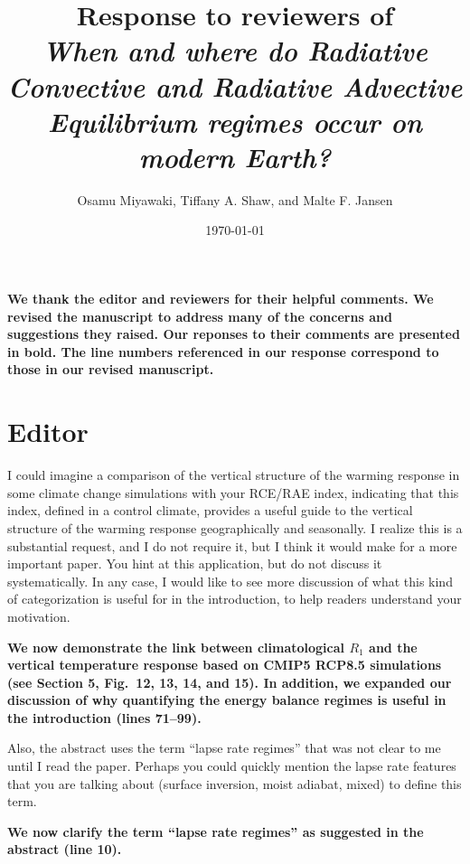 \documentclass{article}
\title{Response to reviewers of \\ \textit{When and where do Radiative Convective and Radiative Advective Equilibrium regimes occur on modern Earth?}}
\date{\today}
\author{Osamu Miyawaki, Tiffany A. Shaw, and Malte F. Jansen}
\begin{document}
\maketitle

\textbf{We thank the editor and reviewers for their helpful comments. We revised the manuscript to address many of the concerns and suggestions they raised. Our reponses to their comments are presented in bold. The line numbers referenced in our response correspond to those in our revised manuscript.}

\section*{Editor}
I could imagine a comparison of the vertical structure of the warming response in some climate change simulations with your RCE/RAE index, indicating that this index, defined in a control climate, provides a useful guide to the vertical structure of the warming response geographically and seasonally.  I realize this is a substantial request, and I do not require it, but I think it would make for a more important paper.  You hint at this application, but do not discuss it systematically.  In any case, I would like to see more discussion of what this kind of categorization is useful for in the introduction, to help readers understand your motivation. 

\textbf{We now demonstrate the link between climatological $R_1$ and the vertical temperature response based on CMIP5 RCP8.5 simulations (see Section 5, Fig.~12, 13, 14, and 15). In addition, we expanded our discussion of why quantifying the energy balance regimes is useful in the introduction (lines 71--99). }

Also, the abstract uses the term “lapse rate regimes” that was not clear to me until I read the paper.  Perhaps you could quickly mention the lapse rate features that you are talking about (surface inversion, moist adiabat, mixed) to define this term.

\textbf{We now clarify the term ``lapse rate regimes'' as suggested in the abstract (line 10).}
\end{document}
